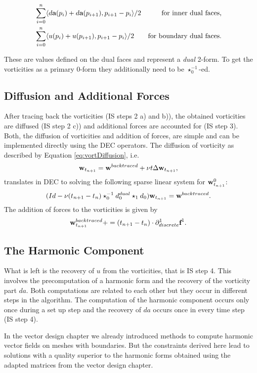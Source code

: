 \begin{align*}
&\sum_{i=0}^n\langle d\textbf{a}(p_i) + d\textbf{a}(p_{i+1}), p_{i+1}-p_{i}\rangle/2 & \text{for inner dual faces,}\\
&\sum_{i=0}^n\langle u(p_i) + u(p_{i+1}), p_{i+1}-p_{i}\rangle/2& \text{for boundary dual faces.}
\end{align*}

These are values defined on the dual faces and represent a \emph{dual} 2-form. To get the vorticities as a primary $0$-form they additionally need to be $\star_0^{-1}$-ed.


\subsection{Diffusion and Additional Forces}
\label{ssec:fd_diffusion_and_forces}

After tracing back the vorticities (IS steps 2 a) and b)), the obtained vorticities are diffused (IS step 2 c)) and additional forces are accounted for (IS step 3).
Both, the diffusion of vorticities and addition of forces, are simple and can be implemented directly using the DEC operators. The diffusion of vorticity as described by Equation \ref{eq:vortDiffusion}, i.e.
\[\textbf{w}_{t_{n+1}} = \textbf{w}^{backtraced} + \nu t \Delta \textbf{w}_{t_{n+1}},\]
translates in DEC to solving the following sparse linear system for $\textbf{w}^0_{t_{n+1}}$:
$$(Id - \nu (t_{n+1}-t_n)  \star_0^{-1} d^{dual}_0\star_1d_0)\textbf{w}_{t_{n+1}} = \textbf{w}^{backtraced}.$$
The addition of forces to the vorticities is given by
$$\textbf{w}^{backtraced}_{t_{n+1}} += (t_{n+1}-t_n)\cdot\partial^1_{discrete} \textbf{f}^1.$$


\subsection{The Harmonic Component}
\label{ssec:fd_harmonic}

What is left is the recovery of $u$ from the vorticities, that is IS step 4. This involves the precomputation of a harmonic form and the recovery of the vorticity part $da$. Both computations are related to each other but they occur in different steps in the algorithm. The computation of the harmonic component occurs only once during a set up step and the recovery of $da$ occurs once in every time step (IS step 4).

In the vector design chapter we already introduced methods to compute harmonic vector fields on meshes with boundaries. But the constraints derived here lead to solutions with a quality superior to the harmonic forms obtained using the adapted matrices from the vector design chapter.

